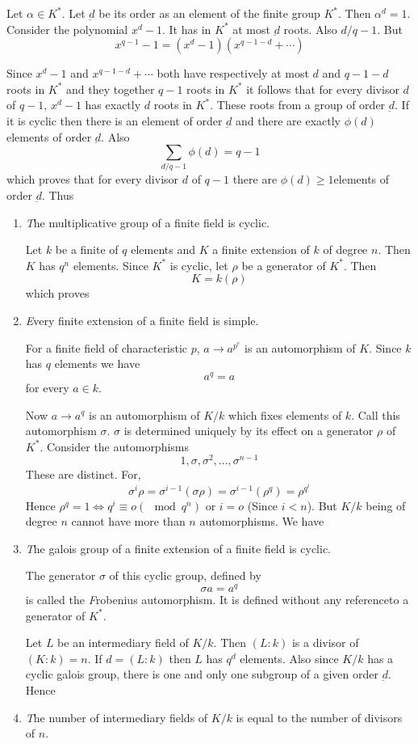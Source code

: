 Let $\alpha \in K^*$. Let $\underbar{d}$ be its order as an element of
the finite group $K^*$. Then $\alpha ^d=1$. Consider the polynomial
$x^d - 1$. It has in $K^*$ at most $\underbar{d}$ roots. Also
$d/q-1$. But  
$$
x^{q-1}-1=(x^d -1)(x^{q-1-d}+\cdots)
$$

Since $x^d-1$ and $x^{q-1-d}+\cdots$ both have respectively at most
$d$ and $q-1-d$ roots in $K^*$ and they together $q-1$ roots in $K^*$
it follows that for every divisor $d$ of $q-1$, $x^d-1$ has exactly $d$
roots in $K^*$. These roots from a group of order $\underbar{d}$. If
it is cyclic then there is an element of order $\underbar{d}$ and
there are exactly $\phi (d)$ elements of order $\underbar{d}$. Also 
$$
\sum_{d/q-1}\phi (d)=q-1
$$
which proves that for every divisor $d$ of $q-1$ there are $\phi
(d)\geq 1$\pageoriginale elements of order $\underbar{d}$. Thus  
\begin{enumerate}[1)]
\item {\textit The multiplicative group of a finite field is cyclic.} 

Let $k$ be a finite of $q$ elements and $K$ a finite extension of $k$
of degree $n$. Then $K$ has $q^n$ elements. Since $K^*$ is cyclic, let
$\rho $ be a generator of $K^*$. Then 
$$
K=k(\rho)
$$
which proves

\item{\textit Every finite extension of a finite field is simple.} 

For a finite field of characteristic $p$, $a \to a^{p^e}$ is an
automorphism of $K$. Since $k$ has $q$ elements we have  
$$
a^q=a
$$
for every $a \in k$.

Now $a \to a^q$ is an automorphism of $K/k$ which fixes elements of
$k$. Call this automorphism $\sigma$. $\sigma$ is determined uniquely
by its effect on a generator $\rho$ of $K^*$. Consider the
automorphisms 
$$
1,\sigma , \sigma^2, \ldots , \sigma^{n-1}
$$ 
These are distinct. For,
$$
\sigma^i \rho = \sigma^{i -1}(\sigma \rho) =\sigma^{i-1}
(\rho^q)=\rho^{q^i} 
$$
Hence $\rho^q=1 \Longleftrightarrow q^i \equiv o(\mod q^n)$ or
$i=o$ (Since $i < n$).  
But $K/k$ being of degree $n$ cannot have more than $n$
automorphisms. We have 

\item {\textit The galois group of a finite extension of a finite
  field is cyclic.} 

The generator $\sigma$ of this cyclic group, defined by
$$
\sigma a=a^q
$$
is called the {\textit Frobenius automorphism.} It is defined without
any reference\pageoriginale to a generator of $K^*$. 

Let $L$ be an intermediary field of $K/k$. Then $(L:k)$ is a divisor
of $(K:k)=n$. If $d=(L:k)$ then $L$ has $q^d$ elements. Also since
$K/k$ has a cyclic galois group, there is one and only one subgroup of
a given order $\underbar{d}$. Hence 

\item {\textit The number of intermediary fields of $K/k$ is equal to
  the number of divisors of $n$.} 
\end{enumerate}


